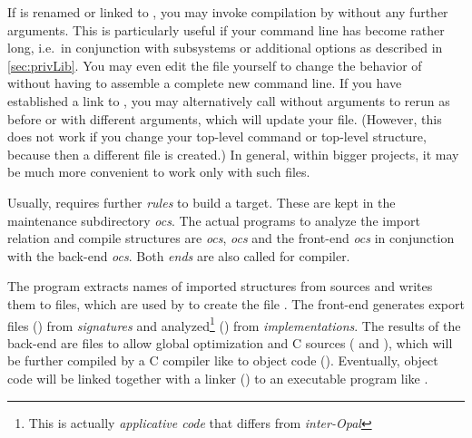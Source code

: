 
If  is renamed or linked to
, you may invoke compilation by  without any
further arguments. This is particularly useful if your command line
has become rather long, i.e.\ in conjunction with subsystems or
additional options as described in \ref{sec:privLib}. You may even
edit the file  yourself to change the behavior of 
without having to assemble a complete new command line. 
If you have established a
link to , you may alternatively call  without arguments
to rerun  as before or with different arguments, which will update
your  file. (However, this does not work if you change 
your top-level command or top-level structure, because then a different file is
created.) In general, 
within bigger projects, it may be much more convenient to work only with
such  files. 

Usually,  requires further \emph{rules} to build a target. These
are kept in the \opal{} maintenance subdirectory {\it
ocs\/}. The actual
programs to analyze the import relation and compile \opal{} structures
are {\it ocs\/}, {\it ocs\/} and
the front-end {\it ocs\/} 
in conjunction with the back-end {\it ocs\/}.
Both {\em ends} are also called  for \opal{} compiler. 

The program  extracts names of imported structures from
sources and writes them to  files, which are used by
 to create the file . The front-end 
 generates export files () from \emph{signatures} and
analyzed\footnote{This is actually {\em applicative code} that differs from 
{\em inter-Opal\/}} \opal{}
() from \emph{implementations}.
The results of the back-end
 are  files to allow global optimization and C sources
( and ),
which will be further compiled by a 
C compiler like  to object code ().  Eventually, object
code will be linked together with a linker () to an executable
program like .

